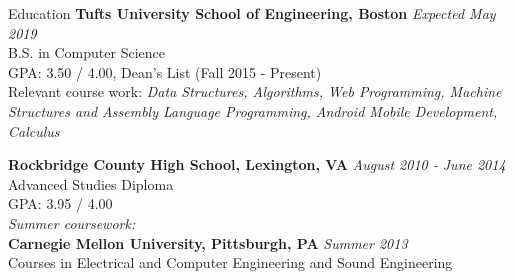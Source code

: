 \documentclass{resume}
\begin{document}
  \begin{rSection}{Education}
    {\bf Tufts University School of Engineering, Boston} \hfill {\em Expected May 2019} \\ 
    { B.S. in Computer Science} \\
    GPA: 3.50 / 4.00, Dean's List (Fall 2015 - Present)\\
    Relevant course work: \textit{Data Structures, Algorithms, Web Programming, Machine Structures and Assembly Language Programming, Android Mobile Development, Calculus}
    
    {\bf Rockbridge County High School, Lexington, VA} \hfill {\em  August 2010 - June 2014} \\ 
    Advanced Studies Diploma \\
    GPA: 3.95 / 4.00\\
    {\em Summer coursework:}\\
    {\bf Carnegie Mellon University, Pittsburgh, PA} \hfill {\em  Summer 2013} \\ 
    Courses in Electrical and Computer Engineering and Sound Engineering
  \end{rSection}
  
\end{document}
